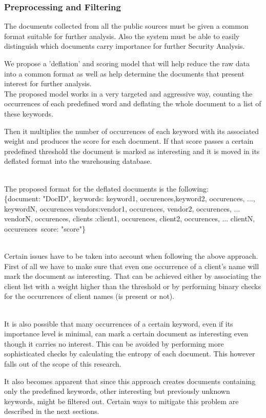 \documentclass[12pt]{article}
\newcounter{subsubsubsection}[subsubsection]
\begin{document}
\newpage
\subsubsection{Preprocessing and Filtering}
The documents collected from all the public sources must be given a common format suitable for further analysis. Also the system must be able to easily distinguish which documents carry importance for further Security Analysis. 

We propose a 'deflation' and scoring model that will help reduce the raw data into a common format as well as help determine the documents that present interest for further analysis. 
\hfill \break\\
The proposed model works in a very targeted and aggressive way, counting the occurrences of each predefined word and deflating the whole document to a list of these keywords. 
\hfill \break\\
\parbox{\linewidth}{
Then it multiplies the number of occurrences of each keyword with its associated weight and produces the score for each document. If that score passes a certain predefined threshold the document is marked as interesting and it is moved in its deflated format into the warehousing database. 
}
\hfill \break\\
The proposed format for the deflated documents is the following:\\

\{document: "DocID", keywords: \lbrack \lbrack keyword1, occurences\rbrack,\lbrack keyword2, occurences\rbrack, ..., \lbrack keywordN, occurences\rbrack \rbrack\,vendors:\lbrack\lbrack vendor1, occurences\rbrack, \lbrack vendor2, occurences\rbrack, ... \lbrack vendorN, occurences\rbrack  \rbrack, clients :\lbrack\lbrack client1, occurences\rbrack, \lbrack client2, occurences\rbrack, ... \lbrack clientN, occurences\rbrack  \rbrack\, score: "score"\}
\hfill \break\\\\
\parbox{\linewidth}{
Certain issues have to be taken into account when following the above approach. First of all we have to make sure that even one occurrence of a client's name will mark the document as interesting. That can be achieved either by associating the client list with a weight higher than the threshold or by performing binary checks for the occurrences of client names (is present or not). 
}
\hfill \break\\
It is also possible that many occurrences of a certain keyword, even if its importance level is minimal, can mark a certain document as interesting even though it carries no interest. This can be avoided by performing more sophisticated checks by calculating the entropy of each document. This however falls out of the scope of this research.
\hfill \break\\
\parbox{\linewidth}{
It also becomes apparent that since this approach creates documents containing only the predefined keywords, other interesting but previously unknown keywords, might be filtered out. Certain ways to mitigate this problem are described in the next sections. 
}
\end{document}
